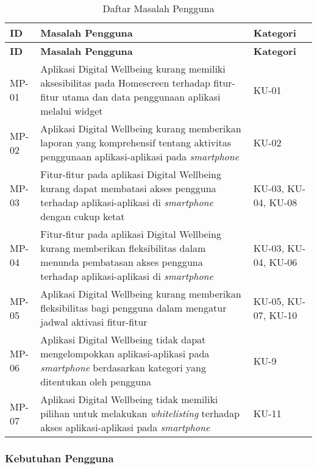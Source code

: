 \RaggedLeft
\begin{longtable}[c]{|W{c}{0.12\textwidth}|>{\baselineskip=12pt}m{0.65\textwidth}|>{\centering\arraybackslash\baselineskip=12pt}m{0.15\textwidth}|}
  \caption{Daftar Masalah Pengguna}
  \label{tab:daftar_masalah} \\
  \hline {}
  \textbf{ID} & \centering\textbf{Masalah Pengguna} & \textbf{Kategori} \\ \hline \endfirsthead
  \hline {}
  \textbf{ID} & \centering\textbf{Masalah Pengguna} & \textbf{Kategori} \\ \hline \endhead

  \hline \endfoot

  MP-01  & Aplikasi Digital Wellbeing kurang memiliki aksesibilitas pada Homescreen terhadap fitur-fitur utama dan data penggunaan aplikasi melalui widget & KU-01 \\ \hline
  MP-02  & Aplikasi Digital Wellbeing kurang memberikan laporan yang komprehensif tentang aktivitas penggunaan aplikasi-aplikasi pada \textit{smartphone} & KU-02 \\ \hline
  MP-03  & Fitur-fitur pada aplikasi Digital Wellbeing kurang dapat membatasi akses pengguna terhadap aplikasi-aplikasi di \textit{smartphone} dengan cukup ketat & KU-03, KU-04, KU-08 \\ \hline
  MP-04  & Fitur-fitur pada aplikasi Digital Wellbeing kurang memberikan fleksibilitas dalam menunda pembatasan akses pengguna terhadap aplikasi-aplikasi di \textit{smartphone} & KU-03, KU-04, KU-06 \\ \hline
  MP-05  & Aplikasi Digital Wellbeing kurang memberikan fleksibilitas bagi pengguna dalam mengatur jadwal aktivasi fitur-fitur & KU-05, KU-07, KU-10 \\ \hline
  MP-06  & Aplikasi Digital Wellbeing tidak dapat mengelompokkan aplikasi-aplikasi pada \textit{smartphone} berdasarkan kategori yang ditentukan oleh pengguna & KU-9 \\ \hline
  MP-07  & Aplikasi Digital Wellbeing tidak memiliki pilihan untuk melakukan \textit{whitelisting} terhadap akses aplikasi-aplikasi pada \textit{smartphone} & KU-11 \\ \hline
\end{longtable}
\justifying

\FloatBarrier


\subsubsection{Kebutuhan Pengguna}
\label{subsubsec:kebutuhan_pengguna}


